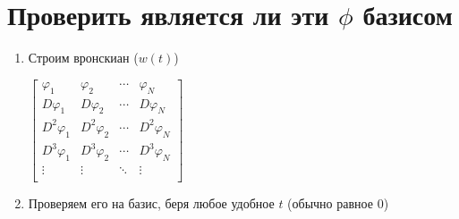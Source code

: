 \documentclass[a4paper, 12pt]{article}
\begin{document}
\section{Проверить является ли эти $\phi$ базисом}
\begin{enumerate}
    \item Строим вронскиан ($w(t)$)
    
    $
    \begin{bmatrix}
        \varphi_1 & \varphi_2 & \cdots & \varphi_N \\
        D\varphi_1 & D\varphi_2 & \cdots & D\varphi_N \\
        D^2\varphi_1 & D^2\varphi_2 & \cdots & D^2\varphi_N \\
        D^3\varphi_1 & D^3\varphi_2 & \cdots & D^3\varphi_N \\
        \vdots & \vdots & \ddots & \vdots \\
    \end{bmatrix}
    $

    \item Проверяем его на базис, беря любое удобное $t$ (обычно равное $0$)
\end{enumerate}
\end{document}
